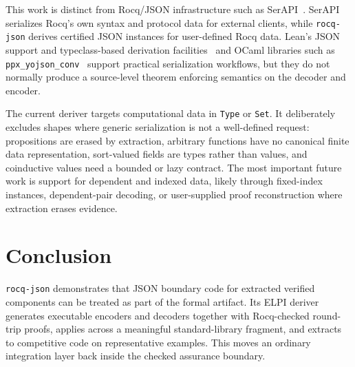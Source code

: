 \documentclass[runningheads]{llncs}
\begin{document}
This work is distinct from Rocq/JSON infrastructure such as
SerAPI~\cite{GallegoArias:2016:SerAPI}.  SerAPI serializes Rocq's own syntax and
protocol data for external clients, while \texttt{rocq-json} derives certified
JSON instances for user-defined Rocq data.  Lean's JSON support and typeclass-based
derivation facilities~\cite{moura2015lean,Lean4Json} and OCaml libraries such
as \texttt{ppx\_yojson\_conv}~\cite{PpxYojsonConv} support practical
serialization workflows, but they do not normally produce a source-level
theorem enforcing semantics on the decoder and encoder.

The current deriver targets computational data in \texttt{Type} or
\texttt{Set}.  It deliberately excludes shapes where generic serialization is
not a well-defined request: propositions are erased by extraction, arbitrary
functions have no canonical finite data representation, sort-valued fields are
types rather than values, and coinductive values need a bounded or lazy
contract.  The most important future work is support for dependent and indexed
data, likely through fixed-index instances, dependent-pair decoding, or
user-supplied proof reconstruction where extraction erases evidence.

\section{Conclusion}

\texttt{rocq-json} demonstrates that JSON boundary code for extracted verified
components can be treated as part of the formal artifact.  Its ELPI deriver
generates executable encoders and decoders together with Rocq-checked
round-trip proofs, applies across a meaningful standard-library fragment, and
extracts to competitive code on representative examples.  This moves an
ordinary integration layer back inside the checked assurance boundary.




\newpage
\appendix



\end{document}
